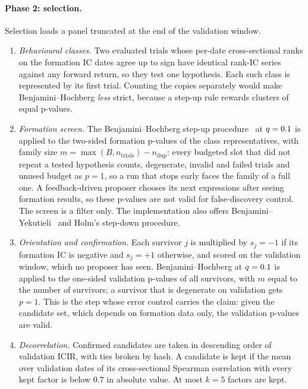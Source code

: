\paragraph{Phase 2: selection.} Selection loads a panel truncated at the end
of the validation window.
\begin{enumerate}
  \item \emph{Behavioural classes.} Two evaluated trials whose per-date
    cross-sectional ranks on the formation IC dates agree up to sign have
    identical rank-IC series against any forward return, so they test one
    hypothesis. Each such class is represented by its first trial. Counting
    the copies separately would make Benjamini--Hochberg \emph{less} strict,
    because a step-up rule rewards clusters of equal p-values.
  \item \emph{Formation screen.} The Benjamini--Hochberg step-up
    procedure~\citep{benjamini1995fdr} at $q=0.1$ is applied to the
    two-sided formation p-values of the class representatives, with family
    size $m=\max(B,n_{\mathrm{trials}})-n_{\mathrm{dup}}$: every budgeted
    slot that did not repeat a tested hypothesis counts, degenerate, invalid
    and failed trials and unused budget as $p=1$, so a run that stops early
    faces the family of a full one. A feedback-driven proposer chooses its
    next expressions after seeing formation results, so these p-values are
    not valid for false-discovery control. The screen is a filter only.
    The implementation also offers
    Benjamini--Yekutieli~\citep{benjamini2001fdr} and Holm's step-down
    procedure. 
  \item \emph{Orientation and confirmation.} Each survivor $j$ is multiplied
    by $s_j=-1$ if its formation IC is negative and $s_j=+1$ otherwise, and
    scored on the validation window, which no proposer has seen.
    Benjamini--Hochberg at $q=0.1$ is applied to the one-sided
    validation p-values of all survivors, with $m$ equal to the number of
    survivors; a survivor that is degenerate on validation gets $p=1$. This
    is the step whose error control carries the claim: given the candidate
    set, which depends on formation data only, the validation p-values are
    valid.
  \item \emph{Decorrelation.} Confirmed candidates are taken in descending
    order of validation ICIR, with ties broken by hash. A candidate is kept
    if the mean over validation dates of its cross-sectional Spearman
    correlation with every kept factor is below $0.7$ in absolute value. At
    most $k=5$ factors are kept.
\end{enumerate}
